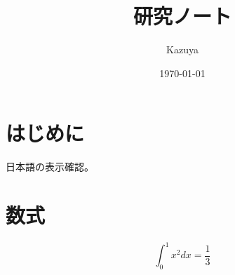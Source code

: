 \documentclass[a4paper]{ltjsarticle}
\title{研究ノート}
\author{Kazuya}
\date{\today}
\begin{document}
\maketitle

\section{はじめに}

日本語の表示確認。

\section{数式}

\[
\int_0^1 x^2 dx = \frac{1}{3}
\]
\end{document}
